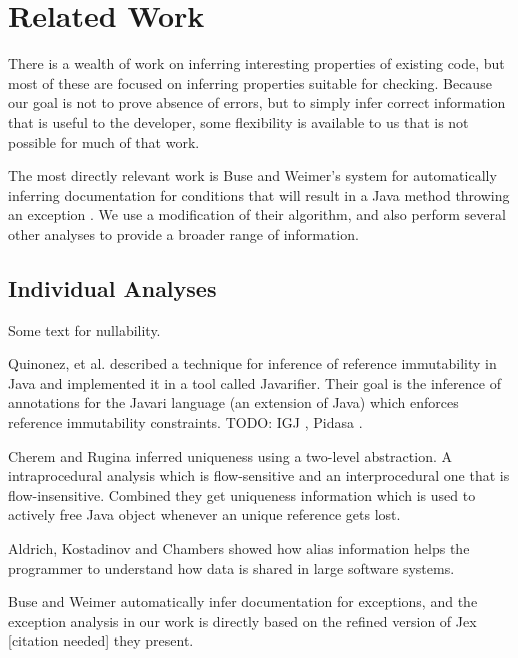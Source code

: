 \section{Related Work}
There is a wealth of work on inferring interesting properties of existing code,
but most of these are focused on inferring properties suitable for checking.
Because our goal is not to prove absence of errors, but to simply infer correct
information that is useful to the developer, some flexibility is available to us
that is not possible for much of that work.

The most directly relevant work is Buse and Weimer's system for automatically
inferring documentation for conditions that will result in a Java method
throwing an exception \cite{autodoc}.  We use a modification of their
algorithm, and also perform several other analyses to provide a broader range
of information.

\subsection{Individual Analyses}
Some text for nullability.

Quinonez, et al. \cite{Javarifier} described a technique for inference of
reference immutability in Java and implemented it in a tool called {\sc
  Javarifier}. Their goal is the inference of annotations for the {\sc Javari}
language (an extension of Java) which enforces reference immutability
constraints. TODO: IGJ \cite{IGJ}, Pidasa \cite{Pidasa}.

Cherem and Rugina \cite{UniquenessInference} inferred uniqueness using a two-level
abstraction. A intraprocedural analysis which is flow-sensitive and an interprocedural
one that is flow-insensitive. Combined they get uniqueness information
which is used to actively free Java object whenever an unique reference gets lost.

Aldrich, Kostadinov and Chambers \cite{AliasJava} showed how alias information 
helps the programmer to understand how data is shared in large software systems.

Buse and Weimer \cite{autodoc} automatically infer documentation for
exceptions, and the exception analysis in our work is directly based on the
refined version of {\sc Jex} [citation needed] they present.
